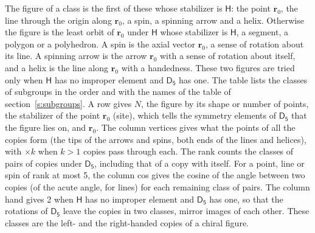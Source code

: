 \documentclass[10pt,a4paper]{article}
\numberwithin{equation}{section}
\newcommand{\grp}[1]{\mathsf{#1}}
\newcommand{\pointr}{\mathbf{r}}
\begin{document}
\leavevmode\label{n:head.figure}The figure of a class is the first of these whose stabilizer is $\grp{H}$: the point $\pointr_0$, the line through the origin along $\pointr_0$, a spin, a spinning arrow and a helix. Otherwise the figure is the least orbit of $\pointr_0$ under $\grp{H}$ whose stabilizer is $\grp{H}$, a segment, a polygon or a polyhedron. A spin is the axial vector $\pointr_0$, a sense of rotation about its line. A spinning arrow is the arrow $\pointr_0$ with a sense of rotation about itself, and a helix is the line along $\pointr_0$ with a handedness. These two figures are tried only when $\grp{H}$ has no improper element and $\grp{D_{5}}$ has one. The table lists the classes of subgroups in the order and with the names of the table of section~\ref{s:subgroups}. \label{n:head.site}A row gives $N$, the figure by its shape or number of points, the stabilizer of the point $\pointr_0$ (site), which tells the symmetry elements of $\grp{D_{5}}$ that the figure lies on, and $\pointr_0$. \label{n:head.vertices}The column vertices gives what the points of all the copies form (the tips of the arrows and spins, both ends of the lines and helices), with ${\times}k$ when $k > 1$ copies pass through each. \label{n:head.rank}The rank counts the classes of pairs of copies under $\grp{D_{5}}$, including that of a copy with itself. \label{n:head.cos}For a point, line or spin of rank at most 5, the column cos gives the cosine of the angle between two copies (of the acute angle, for lines) for each remaining class of pairs. \label{n:head.hand}The column hand gives 2 when $\grp{H}$ has no improper element and $\grp{D_{5}}$ has one, so that the rotations of $\grp{D_{5}}$ leave the copies in two classes, mirror images of each other. These classes are the left- and the right-handed copies of a chiral figure.
\end{document}
